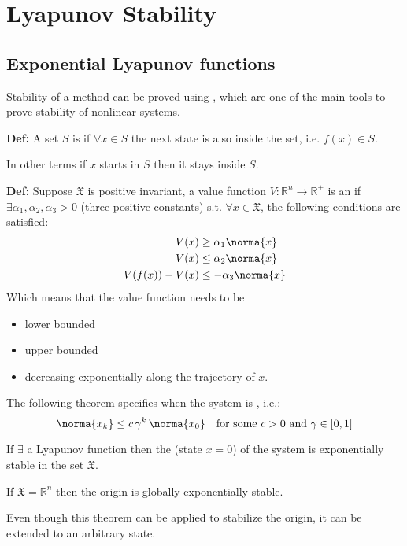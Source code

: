 \chapter{Lyapunov Stability}
\section{Exponential Lyapunov functions}
Stability of a method can be proved using , which are one of the main tools to prove stability of nonlinear systems.

\textbf{Def:} A set $S$ is  if $\forall x \in S$ the next state is also inside the set, i.e. $f(x) \in S$.

In other terms if $x$ starts in $S$ then it stays inside $S$.\newline

\textbf{Def:} Suppose $\mathfrak{X}$ is positive invariant, a value function $V: \mathbb{R}^n \to \mathbb{R}^+$ is an  if $\exists \alpha_1, \alpha_2, \alpha_3 > 0$ (three positive constants) s.t. $\forall x \in \mathfrak{X}$, the following conditions are satisfied:
\begin{align*}
V(x)&\ge \alpha_1 \norma{x}\\
V(x)&\le \alpha_2 \norma{x}\\
V(f(x))-V(x)&\le -\alpha_3\norma{x}
\end{align*} 
Which means that the value function needs to be 
\begin{itemize}
\item lower bounded
\item upper bounded 
\item decreasing exponentially along the trajectory of $x$.
\end{itemize}

The following theorem specifies when the system is , i.e.:
\[\norma{x_k}\le c\,\gamma^k\,\norma{x_0} \quad \text{for some } c >0 \text{ and } \gamma\in[0,1]\]
\begin{theorem}
If $\exists$ a Lyapunov function then the  (state $x=0$) of the system is exponentially stable in the set $\mathfrak{X}$.

If $\mathfrak{X} = \mathbb{R}^n$ then the origin is globally exponentially stable.
\end{theorem}

Even though this theorem can be applied to stabilize the origin, it can be extended to an arbitrary state.

